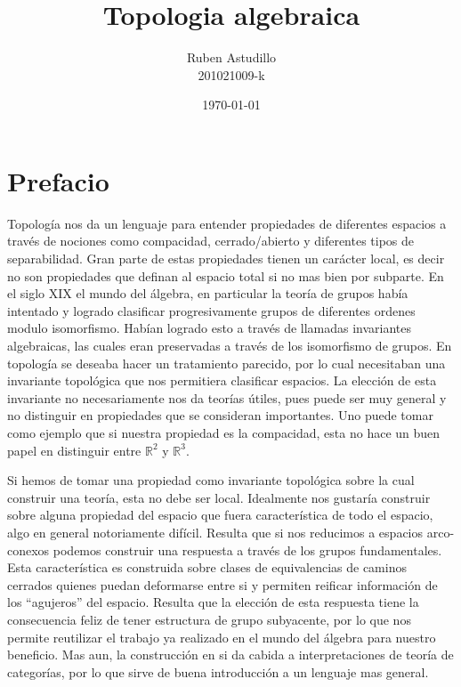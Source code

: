 \documentclass[letterpaper]{article}
\theoremstyle{definition}
\theoremstyle{plain}
\theoremstyle{plain}
\theoremstyle{remark}
\begin{document}
\title{Topologia algebraica}
\author{Ruben Astudillo \\ 201021009-k}
\date{\today}
\maketitle

\section{Prefacio}
Topología nos da un lenguaje para entender propiedades de diferentes
espacios a través de nociones como compacidad, cerrado/abierto y
diferentes tipos
de separabilidad. Gran parte de estas propiedades tienen un carácter
local, es decir no son propiedades que definan al espacio total si no mas
bien por subparte. En el siglo XIX el mundo del álgebra, en
particular la teoría de grupos había intentado y logrado clasificar
progresivamente grupos de diferentes ordenes modulo isomorfismo. Habían
logrado esto a través de llamadas invariantes algebraicas, las cuales
eran preservadas a través de los isomorfismo de grupos. En topología se
deseaba hacer un tratamiento parecido, por lo cual necesitaban una
invariante topológica que nos permitiera clasificar espacios. La elección
de esta invariante no necesariamente nos da teorías útiles, pues puede
ser muy general y no distinguir en propiedades que se consideran
importantes. Uno puede tomar como ejemplo que si nuestra propiedad es
la compacidad, esta no hace un buen papel en distinguir entre
\(\mathbb{R}^2\) y \(\mathbb{R}^3\).

Si hemos de tomar una propiedad como invariante topológica sobre la cual
construir una teoría, esta no debe ser local. Idealmente nos gustaría
construir sobre alguna propiedad del espacio que fuera característica de
todo el espacio, algo en general notoriamente difícil. Resulta que si nos
reducimos a espacios arco-conexos podemos construir una respuesta a través
de los grupos fundamentales. Esta característica es construida sobre
clases de equivalencias de caminos cerrados quienes puedan deformarse
entre si y permiten reificar información de los ``agujeros'' del espacio.
Resulta que la elección de esta respuesta tiene la consecuencia feliz de
tener estructura de grupo subyacente, por lo que nos permite reutilizar
el trabajo ya realizado en el mundo del álgebra para nuestro beneficio.
Mas aun, la construcción en si da cabida a interpretaciones de
teoría de categorías, por lo que sirve de buena introducción a un
lenguaje mas general.
\end{document}
